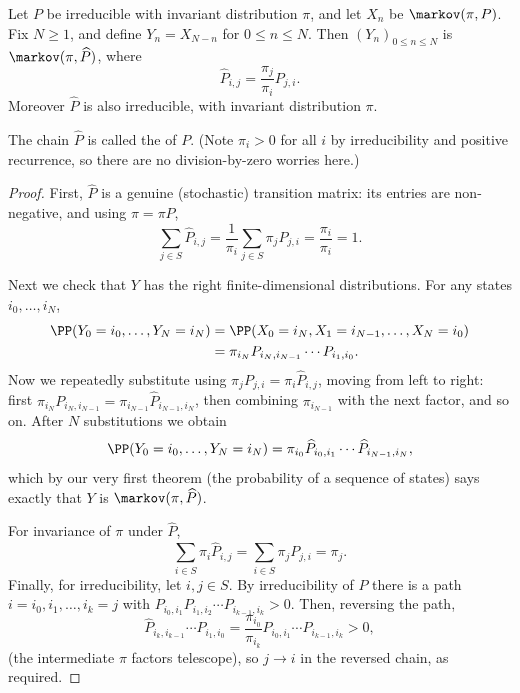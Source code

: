 \begin{theorem}
	Let $P$ be irreducible with invariant distribution $\pi$, and let $X_n$ be $\markov(\pi, P)$. Fix $N \geq 1$, and define $Y_n = X_{N - n}$ for $0 \leq n \leq N$. Then $(Y_n)_{0 \leq n \leq N}$ is $\markov(\pi, \widehat{P})$, where
	$$
	\widehat{P}_{i, j} = \frac{\pi_j}{\pi_i} P_{j, i}.
	$$
	Moreover $\widehat{P}$ is also irreducible, with invariant distribution $\pi$.
\end{theorem}

The chain $\widehat{P}$ is called the  of $P$. (Note $\pi_i > 0$ for all $i$ by irreducibility and positive recurrence, so there are no division-by-zero worries here.)

\begin{proof}
	First, $\widehat{P}$ is a genuine (stochastic) transition matrix: its entries are non-negative, and using $\pi = \pi P$,
	$$
	\sum_{j \in S} \widehat{P}_{i, j} = \frac{1}{\pi_i}\sum_{j \in S} \pi_j P_{j, i} = \frac{\pi_i}{\pi_i} = 1.
	$$

	Next we check that $Y$ has the right finite-dimensional distributions. For any states $i_0, \dots, i_N$,
	\begin{align*}
		\PP(Y_0 = i_0, \dots, Y_N = i_N) &= \PP(X_0 = i_N, X_1 = i_{N -1}, \dots, X_N = i_0) \\
		&= \pi_{i_N} P_{i_N, i_{N - 1}} \cdots P_{i_1, i_0}.
	\end{align*}
	Now we repeatedly substitute using $\pi_j P_{j, i} = \pi_i \widehat{P}_{i, j}$, moving from left to right: first $\pi_{i_N}P_{i_N, i_{N -1}} = \pi_{i_{N - 1}}\widehat{P}_{i_{N - 1}, i_N}$, then combining $\pi_{i_{N-1}}$ with the next factor, and so on. After $N$ substitutions we obtain
	$$
	\PP(Y_0 = i_0, \dots, Y_N = i_N) = \pi_{i_0}\widehat{P}_{i_0, i_1} \cdots \widehat{P}_{i_{N - 1}, i_N},
	$$
	which by our very first theorem (the probability of a sequence of states) says exactly that $Y$ is $\markov(\pi, \widehat{P})$.

	For invariance of $\pi$ under $\widehat{P}$,
	$$
	\sum_{i \in S} \pi_i \widehat{P}_{i, j} = \sum_{i \in S} \pi_j P_{j, i} = \pi_j.
	$$
	Finally, for irreducibility, let $i, j \in S$. By irreducibility of $P$ there is a path $i = i_0, i_1, \dots, i_k = j$ with $P_{i_0, i_1}P_{i_1, i_2} \cdots P_{i_{k - 1}, i_k} > 0$. Then, reversing the path,
	$$
	\widehat{P}_{i_k, i_{k -1}}\cdots \widehat{P}_{i_1, i_0} = \frac{\pi_{i_0}}{\pi_{i_k}} P_{i_0, i_1} \cdots P_{i_{k - 1}, i_k} > 0,
	$$
	(the intermediate $\pi$ factors telescope), so $j \rightarrow i$ in the reversed chain, as required.
\end{proof}


